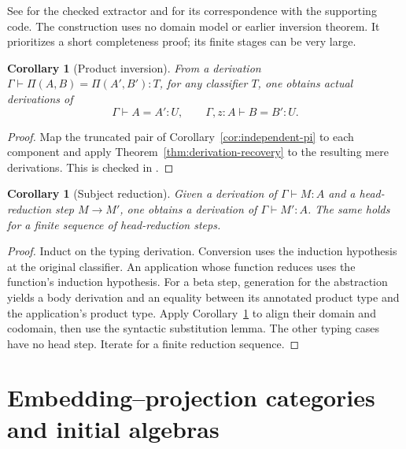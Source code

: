 \documentclass[11pt,a4paper]{article}
\newtheorem{corollary}[theorem]{Corollary}
\theoremstyle{definition}
\theoremstyle{remark}
\begin{document}
See  for the checked extractor and
 for its correspondence with the supporting code.
The construction uses no domain model or earlier inversion theorem.
It prioritizes a short completeness proof; its finite stages can be very
large.

\begin{corollary}[Product inversion]\label{cor:actual-pi}
From a derivation $\Gamma\vdash\Pi(A,B)=\Pi(A',B'):T$, for any
classifier $T$, one obtains actual derivations of
\[
 \Gamma\vdash A=A':U,\qquad \Gamma,z:A\vdash B=B':U.
\]
\end{corollary}
\begin{proof}
Map the truncated pair of Corollary~\ref{cor:independent-pi} to each
component and apply Theorem~\ref{thm:derivation-recovery} to the resulting
mere derivations. This is checked in .
\end{proof}

\begin{corollary}[Subject reduction]\label{cor:subject-reduction}
Given a derivation of $\Gamma\vdash M:A$ and a head-reduction step
$M\longrightarrow M'$, one obtains a derivation of $\Gamma\vdash M':A$.
The same holds for a finite sequence of head-reduction steps.
\end{corollary}
\begin{proof}
Induct on the typing derivation. Conversion uses the induction hypothesis
at the original classifier. An application whose function reduces uses
the function's induction hypothesis. For a beta step, generation for the
abstraction yields a body derivation and an equality between its annotated
product type and the application's product type. Apply
Corollary~\ref{cor:actual-pi} to align their domain and codomain, then use
the syntactic substitution lemma. The other typing cases have no head
step. Iterate for a finite reduction sequence.
\end{proof}

\clearpage
\appendix
\section{Embedding--projection categories and initial algebras}\label{app:categories}
\end{document}
